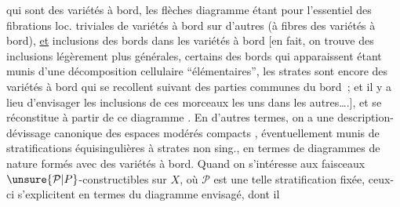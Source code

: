 %
qui sont des variétés à bord, les  flèches 
diagramme étant pour l'essentiel des fibrations
loc. triviales de variétés à bord sur d'autres
(à fibres des variétés à bord), \uline{et}  inclusions
des bords dans les variétés à bord \deleted{(}[en
fait, on trouve des inclusions légèrement
plus générales, certains des bords qui apparaissent
étant munis d'une décomposition
cellulaire ``élémentaires'',  les
strates  sont encore des variétés à bord qui se
recollent suivant des parties communes du
bord~; et il y a lieu d'envisager  les inclusions
de ces morceaux les uns dans les
autres\ldots.\deleted{)}], et se réconstitue à partir de
ce diagramme . En d'autres termes, on
a une description-dévissage canonique
des espaces modérés compacts , éventuellement
munis de stratifications équisingulières
à strates non sing., en termes de diagrammes
 de nature  formés avec des variétés
à bord. Quand on s'intéresse aux faisceaux
$\unsure{\mathcal{P}|P}$-constructibles sur $X$, où $\mathcal{P}$ est une telle
stratification fixée, ceux-ci s'explicitent en
termes du diagramme envisagé, dont il
